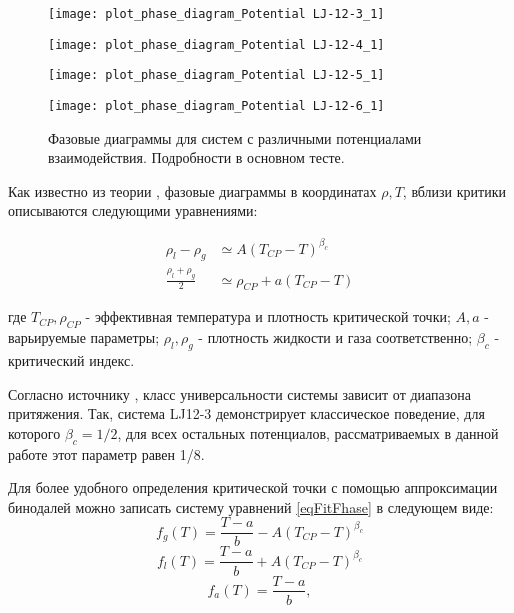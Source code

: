 \begin{figure}[h]
\begin{center}
\begin{minipage}[h]{0.45\linewidth}
\texttt{[image: plot\_phase\_diagram\_Potential LJ-12-3\_1]}
\end{minipage}
\begin{minipage}[h]{0.45\linewidth}
\texttt{[image: plot\_phase\_diagram\_Potential LJ-12-4\_1]}
\end{minipage}


\begin{minipage}[h]{0.45\linewidth}
\texttt{[image: plot\_phase\_diagram\_Potential LJ-12-5\_1]}
\end{minipage}
\begin{minipage}[h]{0.45\linewidth}
\texttt{[image: plot\_phase\_diagram\_Potential LJ-12-6\_1]}
\end{minipage}
\caption{Фазовые диаграммы для систем с различными потенциалами взаимодействия. Подробности в основном тесте.}
\label{risPhaseDiagrammExp}
\end{center}
\end{figure}


Как известно из теории \cite{fitPhase}, фазовые диаграммы в координатах $\rho, T$, вблизи критики описываются следующими уравнениями: 

\begin{equation}
\begin{aligned}
\rho_l - \rho_g &\simeq A (T_{CP} - T)^{\beta_c} \\
\frac{\rho_l + \rho_g}{2} &\simeq \rho_{CP} + a(T_{CP} - T)
\end{aligned}
\label{eqFitFhase}
\end{equation}

где $T_{CP}, \rho_{CP}$ - эффективная температура и плотность критической точки; $A, a$ - варьируемые параметры; $\rho_l, \rho_g$ - плотность жидкости и газа соответственно; $\beta_c$ - критический индекс.

Согласно источнику \cite{classCrit}, класс универсальности системы зависит от диапазона притяжения. Так, система LJ12-3 демонстрирует классическое поведение, для которого $\beta_c = 1/2$, для всех остальных потенциалов, рассматриваемых в данной работе этот параметр равен 1/8.

Для более удобного определения критической точки с помощью аппроксимации бинодалей можно записать систему уравнений \ref{eqFitFhase} в следующем виде:
\begin{equation}
f_g(T) = \frac{T-a}{b} - A(T_{CP} - T)^{\beta_c}
\label{eqFitFhaseGas}
\end{equation}
\begin{equation}
f_l(T) = \frac{T-a}{b} + A(T_{CP} - T)^{\beta_c}
\label{eqFitFhaseLicuid}
\end{equation}
\begin{equation}
f_a(T) = \frac{T-a}{b},
\label{eqFitFhaseAverage}
\end{equation}

